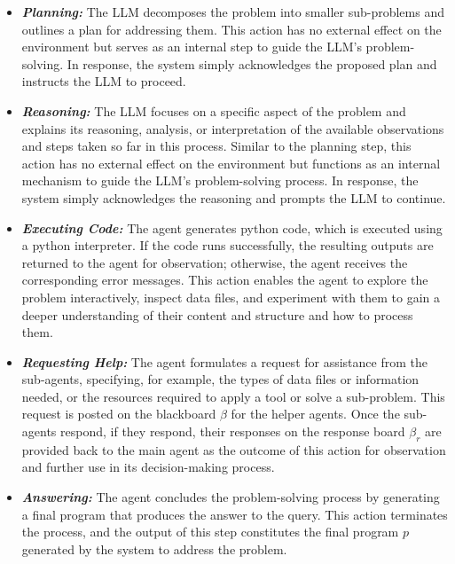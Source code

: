 \begin{itemize}[leftmargin=*]
    \item \textit{\textbf{Planning:}} The LLM decomposes the problem into smaller sub-problems and outlines a plan for addressing them. This action has no external effect on the environment but serves as an internal step to guide the LLM's problem-solving. In response, the system simply acknowledges the proposed plan and instructs the LLM to proceed.
    
    \item \textit{\textbf{Reasoning:}} The LLM focuses on a specific aspect of the problem and explains its reasoning, analysis, or interpretation of the available observations and steps taken so far in this process. Similar to the planning step, this action has no external effect on the environment but functions as an internal mechanism to guide the LLM's problem-solving process. In response, the system simply acknowledges the reasoning and prompts the LLM to continue.
    
    \item \textit{\textbf{Executing Code:}} The agent generates python code, which is executed using a python interpreter. If the code runs successfully, the resulting outputs are returned to the agent for observation; otherwise, the agent receives the corresponding error messages. This action enables the agent to explore the problem interactively, inspect data files, and experiment with them to gain a deeper understanding of their content and structure and how to process them.
    
    \item \textit{\textbf{Requesting Help:}} The agent formulates a request for assistance from the sub-agents, specifying, for example, the types of data files or information needed, or the resources required to apply a tool or solve a sub-problem. This request is posted on the blackboard $\beta$ for the helper agents. Once the sub-agents respond, if they respond, their responses on the response board $\beta_r$ are provided back to the main agent as the outcome of this action for observation and further use in its decision-making process.
    
    \item \textit{\textbf{Answering:}} The agent concludes the problem-solving process by generating a final program that produces the answer to the query. This action terminates the process, and the output of this step constitutes the final program $p$ generated by the system to address the problem.
\end{itemize}

